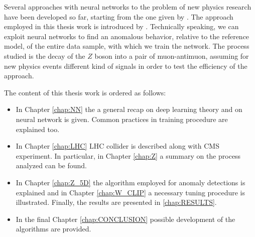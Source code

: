 Several approaches with neural networks to the problem of new physics research have been developed so far, starting from the one given by \cite{baldi}. The approach employed in this thesis work is introduced by \cite{wulzer}. Technically speaking, we can exploit neural networks to find an anomalous behavior, relative to the reference model, of the entire data sample, with which we train the network. The process studied is the decay of the $Z$ boson into a pair of muon-antimuon, assuming for new physics events different kind of signals in order to test the efficiency of the approach.

\vspace{5mm}
\noindent
The content of this thesis work is ordered as follows:
\begin{itemize}
	\item In Chapter \ref{chap:NN} the a general recap on deep learning theory and on neural network is given. Common practices in training procedure are explained too.
	\item In Chapter \ref{chap:LHC} LHC collider is described along with CMS experiment. In particular, in Chapter \ref{chap:Z} a summary on the process analyzed can be found.
	\item In Chapter \ref{chap:Z_5D} the algorithm employed for anomaly detections is explained and in Chapter \ref{chap:W_CLIP} a necessary tuning procedure is illustrated. Finally, the results are presented in \ref{chap:RESULTS}.
	\item In the final Chapter \ref{chap:CONCLUSION} possible development of the algorithms are provided.
\end{itemize}